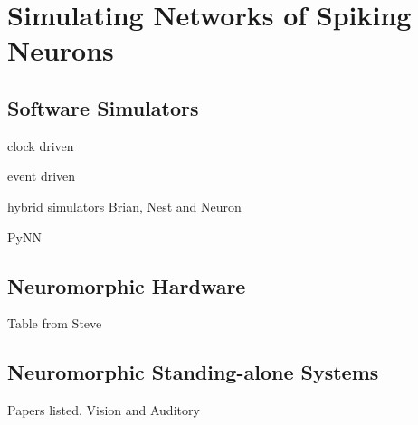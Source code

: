 \section{Simulating Networks of Spiking Neurons}
\label{sec:snn_sim}
\subsection{Software Simulators}
clock driven

event driven

hybrid simulators Brian, Nest and Neuron

PyNN
\subsection{Neuromorphic Hardware}
Table from Steve
\subsection{Neuromorphic Standing-alone Systems}
Papers listed.
Vision and Auditory
\label{sec:morph}

